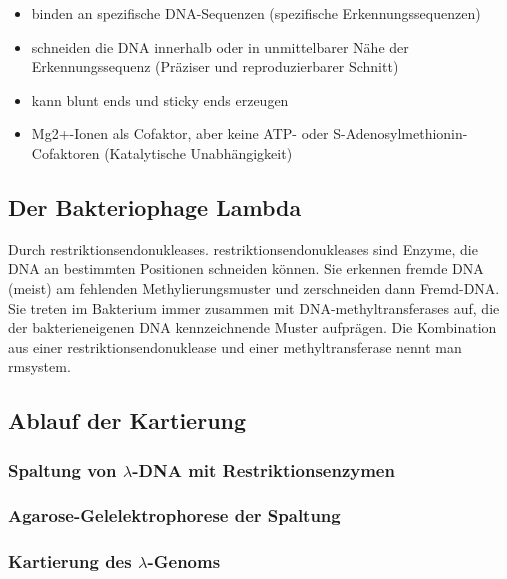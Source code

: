 \begin{mechanism}[title=Beschreiben Sie die Eigenschaften von Restriktionsendonuklease II]
\begin{itemize}
    \item binden an spezifische DNA-Sequenzen (spezifische Erkennungssequenzen)
    \item schneiden die DNA innerhalb oder in unmittelbarer Nähe der Erkennungssequenz (Präziser und reproduzierbarer Schnitt)
    \item kann \gls{blunt ends} und \gls{sticky ends} erzeugen 
    \item Mg2+-Ionen als Cofaktor, aber keine ATP- oder S-Adenosylmethionin-Cofaktoren (Katalytische Unabhängigkeit)
\end{itemize}
\end{mechanism} 

\subsection{Der Bakteriophage Lambda}
\todo
\begin{mechanism}[title=Wie schützen sich Bakterien vor fremder DNA?]
Durch \glspl{restriktionsendonuklease}. \glspl{restriktionsendonuklease} sind Enzyme, die DNA an bestimmten Positionen schneiden können. Sie erkennen fremde DNA (meist) am fehlenden Methylierungsmuster und zerschneiden dann Fremd-DNA. Sie treten im Bakterium immer zusammen mit DNA-\glspl{methyltransferase} auf, die der bakterieneigenen DNA kennzeichnende Muster aufprägen. Die Kombination aus einer \gls{restriktionsendonuklease} und einer \gls{methyltransferase} nennt man \gls{rmsystem}.
\end{mechanism}
\subsection{Ablauf der Kartierung}
\todo
\subsubsection{Spaltung von $\lambda$-DNA mit Restriktionsenzymen}
\todo
\subsubsection{Agarose-Gelelektrophorese der Spaltung}
\todo
\subsubsection{Kartierung des $\lambda$-Genoms}
\todo



